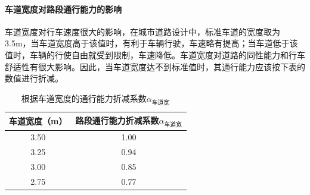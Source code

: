 \documentclass[UTF8,12.05pt]{ctexart}
\begin{document}
\paragraph{车道宽度对路段通行能力的影响}
车道宽度对行车速度很大的影响，在城市道路设计中，标准车道的宽度取为 3.5m，当车道宽度高于该值时，有利于车辆行驶，车速略有提高；当车道低于该值时，车辆的行使自由就受到限制，车速降低。车道宽度对道路的同性能力和行车舒适性有很大影响。因此，当车道宽度达不到标准值时，其通行能力应该按下表的数值进行折减。
\begin{table}[H]
  \centering
  \caption{根据车道宽度的通行能力折减系数$\alpha_{\text{车道宽}}$}
  \begin{tabular}{|c|c|}
    \hline
    车道宽度（m） & 路段通行能力折减系数$\alpha_{\text{车道宽}}$ \\ \hline
    3.50 & 1.00 \\ \hline
    3.25 & 0.94 \\ \hline
    3.00 & 0.85 \\ \hline
    2.75 & 0.77 \\
    \hline
  \end{tabular}
\end{table}
\end{document}
